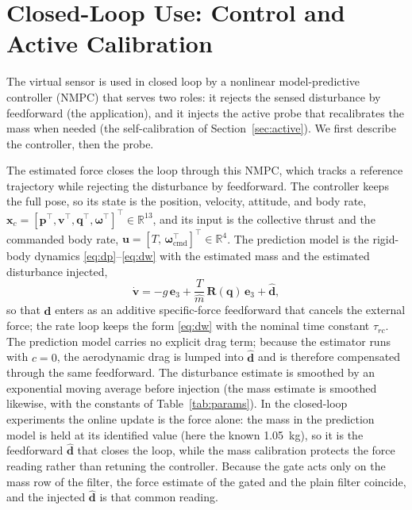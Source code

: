 \documentclass{ieeeaccess}
\newcommand{\R}{\mathbb{R}}
\newcommand{\vect}[1]{\bm{#1}}
\newcommand{\mat}[1]{\mathbf{#1}}
\begin{document}
\section{Closed-Loop Use: Control and Active Calibration}\label{sec:nmpc}

The virtual sensor is used in closed loop by a nonlinear model-predictive
controller (NMPC) that serves two roles: it rejects the sensed disturbance by
feedforward (the application), and it injects the active probe that recalibrates
the mass when needed (the self-calibration of Section~\ref{sec:active}). We first
describe the controller, then the probe.

The estimated force closes the loop through this NMPC, which
tracks a reference trajectory while rejecting the
disturbance by feedforward. The controller keeps the full pose, so its state is
the position, velocity, attitude, and body rate,
$\vect{x}_c=[\vect{p}^{\!\top},\vect{v}^{\!\top},\vect{q}^{\!\top},\vect{\omega}^{\!\top}]^{\!\top}\in\R^{13}$,
and its input is the collective thrust and the commanded body rate,
$\vect{u}=[T,\,\vect{\omega}_{\text{cmd}}^{\!\top}]^{\!\top}\in\R^{4}$. The
prediction model is the rigid-body dynamics
\eqref{eq:dp}--\eqref{eq:dw} with the estimated mass and the estimated
disturbance injected,
\begin{equation}
\dot{\vect{v}} = -g\,\vect{e}_3 + \frac{T}{\hat{m}}\,\mat{R}(\vect{q})\,\vect{e}_3
                  + \hat{\vect{d}},
\label{eq:nmpc-dyn}
\end{equation}
so that $\hat{\vect{d}}$ enters as an additive specific-force feedforward that
cancels the external force; the rate loop keeps the form \eqref{eq:dw} with the
nominal time constant $\tau_{rc}$. The prediction model carries no explicit drag term; because the
estimator runs with $c=0$, the aerodynamic drag is lumped into $\hat{\vect{d}}$
and is therefore compensated through the same feedforward. The disturbance
estimate is smoothed by an exponential moving average before injection (the mass
estimate is smoothed likewise, with the constants of Table~\ref{tab:params}). In the
closed-loop experiments the online update is the force alone: the mass in the
prediction model is held at its identified value (here the known
\SI{1.05}{\kilogram}), so it is the feedforward $\hat{\vect{d}}$ that closes the
loop, while the mass calibration protects the force reading rather than
retuning the controller. Because the gate acts only on the mass row of the
filter, the force estimate of the gated and the plain filter coincide, and the
injected $\hat{\vect{d}}$ is that common reading.
\end{document}
